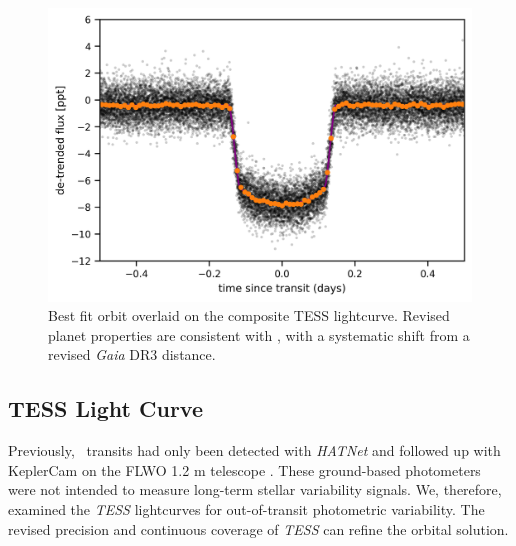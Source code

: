 \documentclass[twocolumn]{aastex631}
\newcommand{\hatpb}{\object{HAT-P-67 b}}
\begin{document}
\begin{figure}
    \includegraphics[width=\linewidth]{figures/best_fit_orbit.png}
    \caption{Best fit orbit overlaid on the composite TESS lightcurve.  Revised planet properties are consistent with \citet{2017AJ....153..211Z}, with a systematic shift from a revised \emph{Gaia} DR3 distance.}
    \label{fig:transit}
\end{figure}

\subsection{TESS Light Curve}
Previously, \hatpb~transits had only been detected with \emph{HATNet} \citep{2004PASP..116..266B} and followed up with KeplerCam on the FLWO 1.2 m telescope \citep{2017AJ....153..211Z}. These ground-based photometers were not intended to measure long-term stellar variability signals.  We, therefore, examined the \emph{TESS} lightcurves for out-of-transit photometric variability.  The revised precision and continuous coverage of \emph{TESS} can refine the orbital solution.
\end{document}
